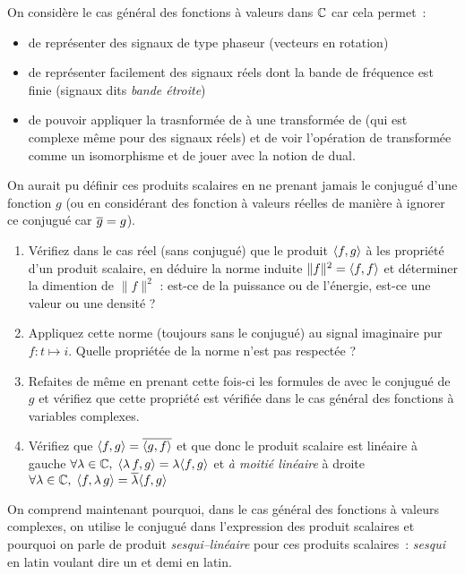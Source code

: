 \begin{remarque}
  On considère le cas général des fonctions à valeurs dans $\mathbb{C}$ car cela permet~:
  \begin{itemize}
  \item de représenter des signaux de type phaseur (vecteurs en rotation)
  \item de représenter facilement des signaux réels dont la bande de
    fréquence est finie (signaux dits \emph{bande étroite})
  \item de pouvoir appliquer la trasnformée de \Fourier{} à une
    transformée de \Fourier{} (qui est complexe même pour des signaux
    réels) et de voir l'opération de transformée comme un isomorphisme
    et de jouer avec la notion de dual.
    \end{itemize}
  \end{remarque}
  
  
  \begin{exercice}
  On aurait pu définir ces produits scalaires en ne prenant jamais le
  conjugué d'une fonction $g$ (ou en considérant des fonction à valeurs réelles de manière à ignorer ce conjugué car $\overline{g}=g$).
  \begin{enumerate}
  \item Vérifiez dans le cas réel (sans conjugué) que le produit $\langle f,g\rangle$ à les propriété d'un produit scalaire, en déduire la norme induite $\|f\|^2=\langle f,f\rangle$ et déterminer la dimention de $\|f\|^2$ : est-ce de la puissance ou de l'énergie, est-ce une valeur ou une densité ?
  \item Appliquez cette norme (toujours sans le conjugué) au signal imaginaire pur
    $f: t\mapsto i$. Quelle propriétée de la norme n'est pas respectée ?
  \item Refaites de même en prenant cette fois-ci les formules de
     avec le conjugué de $g$ et vérifiez que
    cette propriété est vérifiée dans le cas général des fonctions à
    variables complexes.
  \item Vérifiez que $\langle f,g\rangle=\overline{\langle g,f\rangle}$ et que donc le produit scalaire est linéaire à gauche $\forall\lambda\in\mathbb{C},\; \langle\lambda\,f,g\rangle=\lambda\langle f,g\rangle$ et \emph{à moitié linéaire} à droite $\forall \lambda\in\mathbb{C},\; \langle f,\lambda\,g\rangle=\overline{\lambda}\langle f,g\rangle$
  \end{enumerate}
On comprend maintenant pourquoi, dans le cas général des fonctions à valeurs complexes, on utilise le conjugué dans l'expression des produit scalaires et pourquoi on parle de produit \emph{sesqui--linéaire} pour ces produits scalaires~: \emph{sesqui} en latin voulant dire \og{}un et demi\fg{} en latin.  
\end{exercice}


